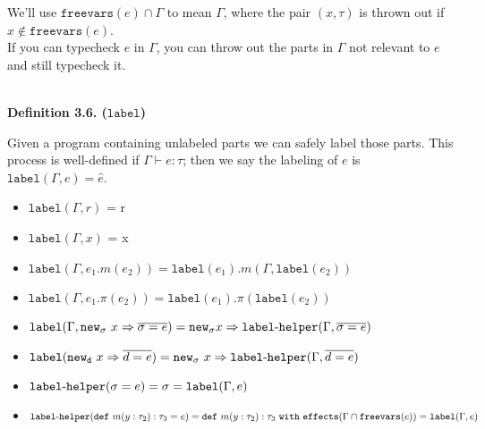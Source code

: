 \documentclass{llncs}
\newcommand{\keywadj}[1]{\mathtt{#1}}
\newcommand{\keyw}[1]{\keywadj{#1}~}
\newcommand{\hyphen}{\hbox{-}}
\begin{document}
\noindent
{} We'll use $\keywadj{freevars}(e) \cap \Gamma$ to mean $\Gamma$, where the pair $(x,\tau)$ is thrown out if $x \notin \keywadj{freevars}(e)$. \\

\noindent
{} If you can typecheck $e$ in $\Gamma$, you can throw out the parts in $\Gamma$ not relevant to $e$ and still typecheck it.\\\\

\begin{large}
\bf{Definition 3.6. ($\keywadj{label}$)}
\end{large}

Given a program containing unlabeled parts we can safely label those parts. This process is well-defined if $\Gamma \vdash e:  \tau$; then we say the labeling of $e$ is $\keywadj{label}(\Gamma, e) = \hat e$.

\begin{itemize}
	\item $\keywadj{label}(\Gamma, r)$ = r
	\item $\keywadj{label}(\Gamma, x)$ = x
	\item $\keywadj{label}(\Gamma, e_1.m(e_2)) = \keywadj{label}(e_1).m(\Gamma, \keywadj{label}(e_2))$
	\item $\keywadj{label}(\Gamma, e_1.\pi(e_2)) = \keywadj{label}(e_1).\pi(\keywadj{label}(e_2))$
	\item $\keywadj{label}(\Gamma, \keyw{new_\sigma} x \Rightarrow \overline{\sigma = e}) = \keywadj{new}_\sigma x \Rightarrow \keywadj{label \hyphen helper}(\Gamma, \overline{\sigma = e})$
	\item $\keywadj{label}(\keyw{new_d} x \Rightarrow \overline{d = e}) = \keyw{new_\sigma} x \Rightarrow \keywadj{label \hyphen helper}(\Gamma, \overline{d = e})$
	\item $\keywadj{label \hyphen helper}(\sigma = e) = \sigma = \keywadj{label}(\Gamma, e)$
	\item $\keywadj{label \hyphen helper}(\keywadj{def}~m(y : \tau_2) : \tau_3 = e) = \keywadj{def}~m(y : \tau_2) : \tau_3~\keyw{with} \keywadj{effects}(\Gamma \cap \keywadj{freevars}(e)) = \keywadj{label}(\Gamma, e)$
\end{itemize}
\end{document}
